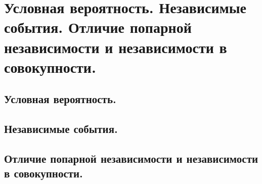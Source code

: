 \section{Условная вероятность. Независимые события. Отличие попарной независимости и независимости в совокупности.}

\subsection{Условная вероятность.}

\subsection{Независимые события.}

\subsection{Отличие попарной независимости и независимости в совокупности.}
